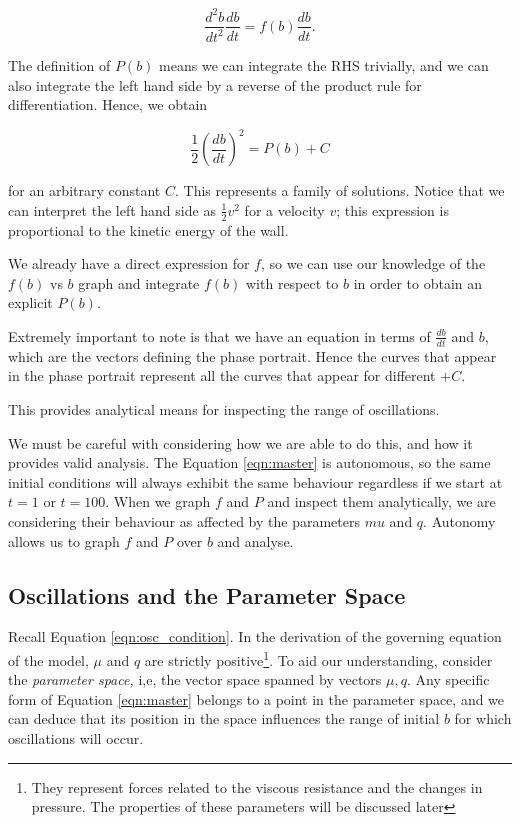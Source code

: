 \documentclass{article}
\begin{document}
\begin{equation*}
    \frac{d^2b}{dt^2} \frac{db}{dt} = f(b) \frac{db}{dt}.
\end{equation*}

The definition of $P(b)$ means we can integrate the RHS trivially,
and we can also integrate the left hand side by a reverse of the product rule for differentiation.
Hence, we obtain

\begin{equation}
    \frac{1}{2}\left(\frac{db}{dt}\right)^2 = P(b) + C
    \label{eqn:integral_kinetic_energy}
\end{equation}

for an arbitrary constant $C$. This represents a family of solutions.
Notice that we can interpret the left hand side as $\frac{1}{2}v^2$ for a velocity $v$;
this expression is proportional to the kinetic energy of the wall.

We already have a direct expression for $f$,
so we can use our knowledge of the $f(b)$ vs $b$ graph and integrate $f(b)$ with respect to $b$
in order to obtain an explicit $P(b)$.

Extremely important to note is that we have an equation in terms of $\frac{db}{dt}$ and $b$, which are the vectors defining the phase portrait.
Hence the curves that appear in the phase portrait represent all the curves that appear for different $+C$.


This provides analytical means for inspecting the range of oscillations.

We must be careful with considering how we are able to do this, and how it provides valid analysis.
The Equation \ref{eqn:master} is autonomous,
so the same initial conditions will always exhibit the same behaviour regardless if we start at $t=1$ or $t=100$.
When we graph $f$ and $P$ and inspect them analytically, we are considering their behaviour as affected by the parameters $mu$ and $q$.
Autonomy allows us to graph $f$ and $P$ over $b$ and analyse.

\subsection{Oscillations and the Parameter Space}

Recall Equation \ref{eqn:osc_condition}. In the derivation of the governing equation of the model, $\mu$ and $q$ are strictly positive\footnote{They represent forces related to the viscous resistance and the changes in pressure. The properties of these parameters will be discussed later}.
To aid our understanding, consider the \textit{parameter space,} i,e, the vector space spanned by vectors $\mu, q$.
Any specific form of Equation \ref{eqn:master} belongs to a point in the parameter space,
and we can deduce that its position in the space influences the range of initial $b$ for which oscillations will occur. 
\end{document}
